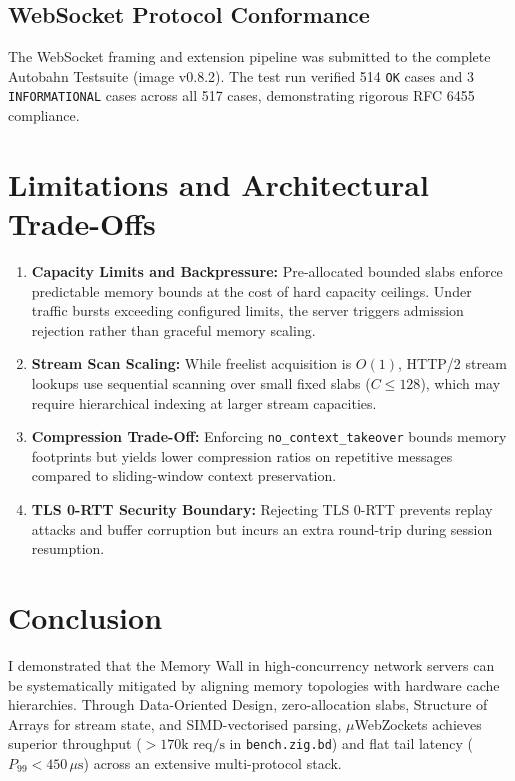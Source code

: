 \documentclass[journal]{IEEEtran}
\begin{document}
\subsection{WebSocket Protocol Conformance}

The WebSocket framing and extension pipeline was submitted to the complete Autobahn Testsuite (image v0.8.2). The test run verified 514 \texttt{OK} cases and 3 \texttt{INFORMATIONAL} cases across all 517 cases, demonstrating rigorous RFC 6455 compliance.

\section{Limitations and Architectural Trade-Offs}

\begin{enumerate}
    \item \textbf{Capacity Limits and Backpressure:} Pre-allocated bounded slabs enforce predictable memory bounds at the cost of hard capacity ceilings. Under traffic bursts exceeding configured limits, the server triggers admission rejection rather than graceful memory scaling.
    \item \textbf{Stream Scan Scaling:} While freelist acquisition is $O(1)$, HTTP/2 stream lookups use sequential scanning over small fixed slabs ($C \le 128$), which may require hierarchical indexing at larger stream capacities.
    \item \textbf{Compression Trade-Off:} Enforcing \texttt{no\_context\_takeover} bounds memory footprints but yields lower compression ratios on repetitive messages compared to sliding-window context preservation.
    \item \textbf{TLS 0-RTT Security Boundary:} Rejecting TLS 0-RTT prevents replay attacks and buffer corruption but incurs an extra round-trip during session resumption.
\end{enumerate}

\section{Conclusion}

I demonstrated that the Memory Wall in high-concurrency network servers can be systematically mitigated by aligning memory topologies with hardware cache hierarchies. Through Data-Oriented Design, zero-allocation slabs, Structure of Arrays for stream state, and SIMD-vectorised parsing, \ensuremath{\mu}WebZockets achieves superior throughput ($>170\text{k req/s}$ in \texttt{bench.zig.bd}) and flat tail latency ($P_{99} < 450\,\mu\text{s}$) across an extensive multi-protocol stack.



\end{document}
